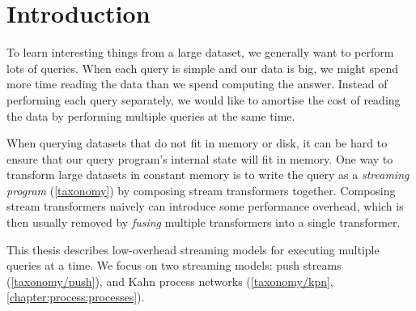 \chapter{Introduction}
\label{introduction}
To learn interesting things from a large dataset, we generally want to perform lots of queries.
When each query is simple and our data is big, we might spend more time reading the data than we spend computing the answer.
Instead of performing each query separately, we would like to amortise the cost of reading the data by performing multiple queries at the same time.

When querying datasets that do not fit in memory or disk, it can be hard to ensure that our query program's internal state will fit in memory.
One way to transform large datasets in constant memory is to write the query as a \emph{streaming program} (\cref{taxonomy}) by composing stream transformers together.
Composing stream transformers naively can introduce some performance overhead, which is then usually removed by \emph{fusing} multiple transformers into a single transformer.

This thesis describes low-overhead streaming models for executing multiple queries at a time.
We focus on two streaming models: push streams (\cref{taxonomy/push}), and Kahn process networks (\cref{taxonomy/kpn}, \cref{chapter:process:processes}).

